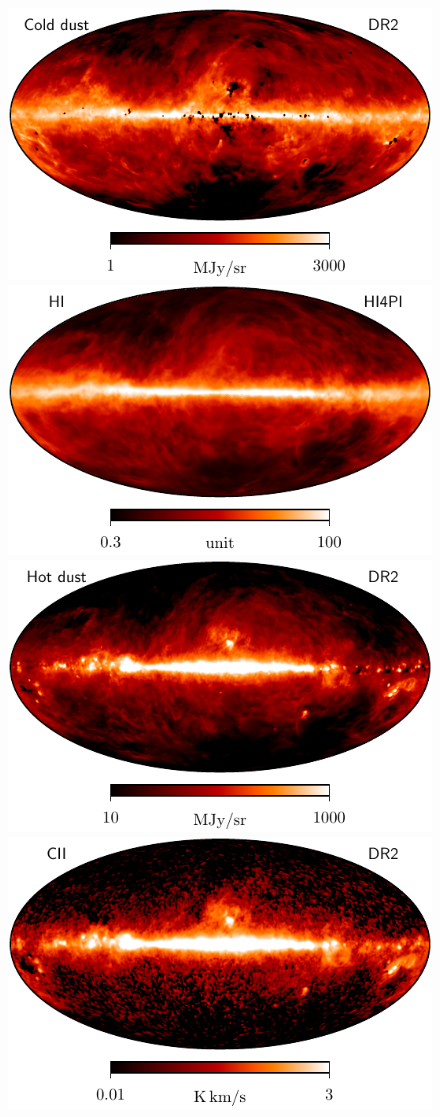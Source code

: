 \documentclass{aa}
\begin{document}

\begin{figure}
  \centering
  \includegraphics[width=0.49\linewidth]{figures/CGDR2_colddust_1deg_n512_v1.pdf}
  \includegraphics[width=0.49\linewidth]{figures/HI4PI_NHI_n0064_60arcmin_rescaled_TQU.pdf}\\
  \includegraphics[width=0.49\linewidth]{figures/CGDR2_hotdust_1deg_n512_v1.pdf}
  \includegraphics[width=0.49\linewidth]{figures/CGDR2_CII_1deg_n512_v1.pdf}\\

\end{figure}
\end{document}
